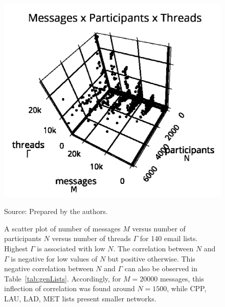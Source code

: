 																							\begin{figure}
																							\centering
																							\caption{A scatter plot of number of messages $M$ versus number of participants $N$ versus number of threads $\Gamma$ for 140 email lists.
																							Highest $\Gamma$ is associated with low $N$.
																							The correlation between $N$ and $\Gamma$ is negative for low values of $N$ but positive otherwise.
																							This negative correlation between $N$ and $\Gamma$ can also be observed in Table~\ref{tab:genLists}.
																							Accordingly, for $M=20000$ messages, this inflection
																							of correlation was found around $N=1500$, while CPP, LAU, LAD, MET lists 
																							present smaller networks.}
																							\includegraphics[trim={0 0 0 1cm},clip,width=.7\columnwidth]{figs/mpgamma2_}
																							\begin{flushleft}
																									Source: Prepared by the authors.\
																									\end{flushleft}
																									\label{fig:nmgamma3d}
																									\end{figure}



